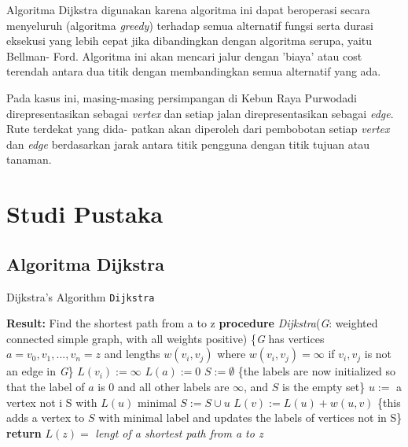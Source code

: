 \documentclass[conference]{IEEEtran}
\begin{document}
    Algoritma Dijkstra digunakan karena algoritma ini dapat
    beroperasi secara menyeluruh (algoritma \textit{greedy}) terhadap
    semua alternatif fungsi serta durasi eksekusi yang lebih cepat
    jika dibandingkan dengan algoritma serupa, yaitu Bellman-
    Ford. Algoritma ini akan mencari jalur dengan ’biaya’ atau
    cost terendah antara dua titik dengan membandingkan semua
    alternatif yang ada.

    Pada kasus ini, masing-masing persimpangan di Kebun
    Raya Purwodadi direpresentasikan sebagai \textit{vertex} dan setiap
    jalan direpresentasikan sebagai \textit{edge}. Rute terdekat yang dida-
    patkan akan diperoleh dari pembobotan setiap \textit{vertex} dan \textit{edge}
    berdasarkan jarak antara titik pengguna dengan titik tujuan
    atau tanaman.

\section{Studi Pustaka}
\subsection{Algoritma Dijkstra}
\begin{algorithm}
\caption{Dijkstra’s Algorithm \texttt{Dijkstra}}\label{alg:cap}
\begin{algorithmic}
\State \textbf{Result:} Find the shortest path from a to z
\State \textbf{procedure} \textit{Dijkstra}(\textit{G}: weighted connected simple
graph, with all weights positive)
\State \{\textit{G} has vertices $ a = v_0, v_1, ..., v_n = z$ and lengths $w(v_i, v_j)$ where $w(v_i, v_j) = \infty$ if $v_i, v_j$ is not an edge in \textit{G}\}
\State $L(v_i) := \infty$
\EndFor
\State $L(a) := 0$
\State $S := \emptyset$
\State \{the labels are now initialized so that the label of $a$ is
0 and all other labels are $\infty$, and $S$ is the empty set\}
\State $u :=$ a vertex not i S with $L(u)$ minimal
\State $S := S \cup {u}$
\State $L(v) := L(u) + w(u,v)$
\State \{this adds a vertex to $S$ with minimal label and updates the labels of vertices not in S\}
\EndIf
\EndFor
\EndWhile
\State \textbf{return} $L(z) =$ \textit{lengt of a shortest path from a to z}
\end{algorithmic}
\end{algorithm}
\end{document}

